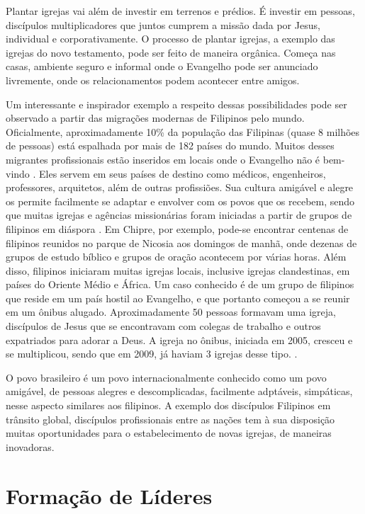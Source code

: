 \documentclass[12pt]{abntex2}
\begin{document}
Plantar igrejas vai além de investir em terrenos e prédios. É investir em pessoas, discípulos multiplicadores que juntos cumprem a missão dada por Jesus, individual e corporativamente. O processo de plantar igrejas, a exemplo das igrejas do novo testamento, pode ser feito de maneira orgânica. Começa nas casas, ambiente seguro e informal onde o Evangelho pode ser anunciado livremente, onde os relacionamentos podem acontecer entre amigos.

Um interessante e inspirador exemplo a respeito dessas possibilidades pode ser observado a partir das migrações modernas de Filipinos pelo mundo. Oficialmente, aproximadamente 10\% da população das Filipinas (quase 8 milhões de pessoas) está espalhada por mais de 182 países do mundo. Muitos desses migrantes profissionais estão inseridos em locais onde o Evangelho não é bem-vindo \cite[p. 3]{wan2009filipino}. Eles servem em seus países de destino como médicos, engenheiros, professores, arquitetos, além de outras profissiões. Sua cultura amigável e alegre os permite facilmente se adaptar e envolver com os povos que os recebem, sendo que muitas igrejas e agências missionárias foram iniciadas a partir de grupos de filipinos em diáspora \cite[5,6]{wan2009filipino}. Em Chipre, por exemplo, pode-se encontrar centenas de filipinos reunidos no parque de Nicosia aos domingos de manhã, onde dezenas de grupos de estudo bíblico e grupos de oração acontecem por várias horas. Além disso, filipinos iniciaram muitas igrejas locais, inclusive igrejas clandestinas, em países do Oriente Médio e África. Um caso conhecido é de um grupo de filipinos que reside em um país hostil ao Evangelho, e que portanto começou a se reunir em um ônibus alugado. Aproximadamente 50 pessoas formavam uma igreja, discípulos de Jesus que se encontravam com colegas de trabalho e outros expatriados para adorar a Deus. A igreja no ônibus, iniciada em 2005, cresceu e se multiplicou, sendo que em 2009, já haviam 3 igrejas desse tipo. \cite[8]{wan2009filipino}.

O povo brasileiro é um povo internacionalmente conhecido como um povo amigável, de pessoas alegres e descomplicadas, facilmente adptáveis, simpáticas, nesse aspecto similares aos filipinos. A exemplo dos discípulos Filipinos em trânsito global, discípulos profissionais entre as nações tem à sua disposição muitas oportunidades para o estabelecimento de novas igrejas, de maneiras inovadoras. 

\section{Formação de Líderes}
\end{document}
